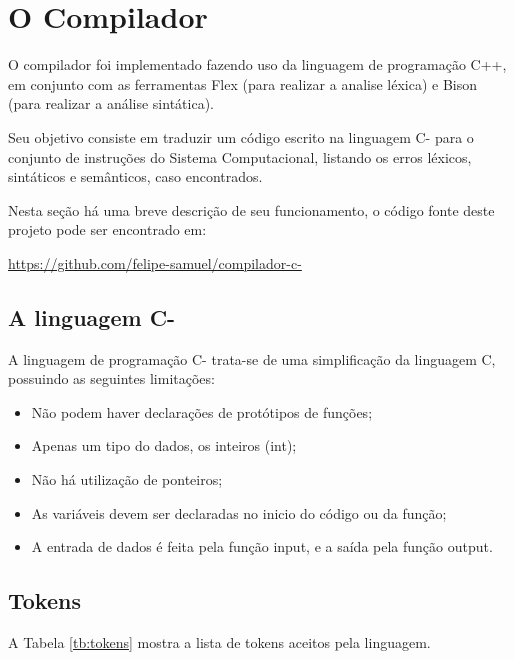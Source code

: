 \section{O Compilador}

O compilador foi implementado fazendo uso da linguagem de programação C++, em conjunto com as ferramentas Flex (para realizar a analise léxica) e Bison (para realizar a análise sintática).

Seu objetivo consiste em traduzir um código escrito na linguagem C- para o conjunto de instruções do Sistema Computacional, listando os erros léxicos, sintáticos e semânticos, caso encontrados.

Nesta seção há uma breve descrição de seu funcionamento, o código fonte deste projeto pode ser encontrado em: 

\url{https://github.com/felipe-samuel/compilador-c-}
 

\subsection{A linguagem C-}

A linguagem de programação C- trata-se de uma simplificação da linguagem C, possuindo as seguintes limitações:

\begin{itemize}
	\item Não podem haver declarações de protótipos de funções;
	
	\item Apenas um tipo do dados, os inteiros (int);
	
	\item Não há utilização de ponteiros;
	
	\item As variáveis devem ser declaradas no inicio do código ou da função;
	
	\item A entrada de dados é feita pela função input, e a saída pela função output.
\end{itemize} 

\subsection{Tokens}

A Tabela \ref{tb:tokens} mostra a lista de tokens aceitos pela linguagem.

\clearpage

